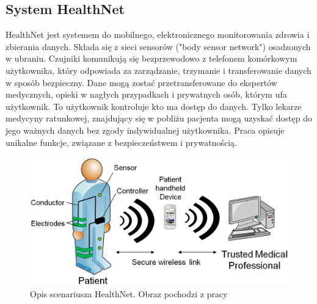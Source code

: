 \subsection{System HealthNet \cite{5534981}}
HealthNet jest systemem do mobilnego, elektronicznego monitorowania zdrowia i zbierania danych. Składa się z sieci sensorów ("body sensor network") osadzonych w ubraniu. Czujniki komunikują się bezprzewodowo z telefonem komórkowym użytkownika, który odpowiada za zarządzanie, trzymanie i transferowanie danych w sposób bezpieczny. Dane mogą zostać przetransferowane do ekspertów medycznych, opieki w nagłych przypadkach i prywatnych osób, którym ufa użytkownik. To użytkownik kontroluje kto ma dostęp do danych. Tylko lekarze medycyny ratunkowej, znajdujący się w pobliżu pacjenta mogą uzyskać dostęp do jego ważnych danych bez zgody indywidualnej użytkownika. Praca opisuje unikalne funkcje, związane z bezpieczeństwem i prywatnością. 

\begin{figure}[h!]
	\centering
		\includegraphics[scale=0.3]{Security_and_Privacy_for_Mobile_Electronic_Health_Monitoring_and_Recording_Systems_fig1}
	\caption{Opis scenariusza HealthNet. Obraz pochodzi z pracy \cite{5534981}}
\end{figure}

